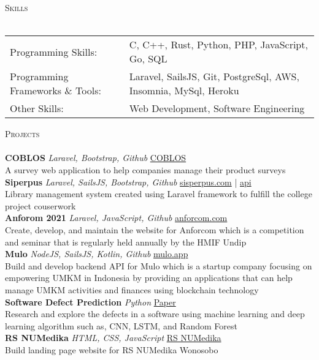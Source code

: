 \documentclass[a4paper]{article}
\newcommand{\lineunder} {
    \vspace*{-8pt} \\
    \hspace*{-18pt} \hrulefill \\
}
\newcommand{\header} [1] {
    {\hspace*{-18pt}\vspace*{6pt} \textsc{#1}}
    \vspace*{-6pt} \lineunder
}
\begin{document}
\header{Skills}
\begin{tabular}{ l l }
	Programming Skills:              & C, C++, Rust, Python, PHP, JavaScript, Go, SQL      \\
	Programming Frameworks \& Tools: & Laravel, SailsJS, Git, PostgreSql, AWS, Insomnia, MySql, Heroku      \\
	Other Skills:                    & Web Development, Software Engineering \\
\end{tabular}
\vspace{2mm}

\header{Projects}
{\textbf{COBLOS}} {\sl Laravel, Bootstrap, Github} \hfill \href{https://coblos.herokuapp.com/}{COBLOS}\\
A survey web application to help companies manage their product surveys\\
\vspace*{2mm}
{\textbf{Siperpus}} {\sl Laravel, SailsJS, Bootstrap, Github} \hfill \href{http://sisperpus.herokuapp.com/}{sisperpus.com} | \href{https://pbp-siperpus.herokuapp.com/}{api}\\
Library management system created using Laravel framework to fulfill the college project couserwork \\
\vspace*{2mm}
{\textbf{Anforom 2021}} {\sl Laravel, JavaScript, Github} \hfill \href{https://anforcom.com}{anforcom.com}\\
Create, develop, and maintain the website for Anforcom which is a competition and seminar that is regularly held annually by the HMIF Undip\\
\vspace*{2mm}
{\textbf{Mulo}} {\sl NodeJS, SailsJS, Kotlin, Github} \hfill \href{https://mulo.app}{mulo.app}\\
Build and develop backend API for Mulo which is a startup company focusing on empowering UMKM in Indonesia by providing an applications that can help manage UMKM activities and finances using blockchain technology\\
\vspace*{2mm}
{\textbf{Software Defect Prediction}} {\sl Python} \hfill \href{https://github.com/mhnaufal/Software-Defect-Finale/blob/main/reports/PAPER-Software%20Defect%20Prediction.pdf}{Paper}\\
Research and explore the defects in a software using machine learning and deep learning algorithm such as, CNN, LSTM, and Random Forest\\
\vspace*{2mm}
{\textbf{RS NUMedika}} {\sl HTML, CSS, JavaScript} \hfill \href{http://rsnuwonosobo.com/}{RS NUMedika}\\
Build landing page website for RS NUMedika Wonosobo\\
\vspace*{2mm}
\end{document}

